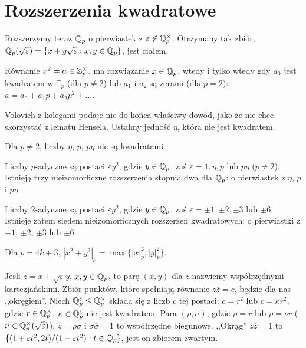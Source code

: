 \section{Rozszerzenia kwadratowe}
Rozszerzymy teraz $\mathbb Q_p$ o pierwiastek z $\varepsilon \not \in \mathbb Q_p^\times$. Otrzymany tak zbiór, $\mathbb Q_p(\sqrt{\varepsilon}) = \{x + y \sqrt{\varepsilon} : x, y \in \mathbb Q_p\}$, jest ciałem.

\begin{lemat}
	Równanie $x^2 = a \in \mathbb Z_p^\times$, ma rozwiązanie $x \in \mathbb Q_p$, wtedy i tylko wtedy gdy $a_0$ jest kwadratem w $\mathbb F_p$ (dla $p \neq 2$) lub $a_ 1$ i $a_2$ są zerami (dla $p = 2$): $a = a_0 + a_1p + a_2p^2 + \ldots$.
\end{lemat}

Volovich z kolegami podaje nie do końca właściwy dowód, jako że nie chce skorzystać z lematu Hensela.
Ustalmy  jedność $\eta$, która nie jest kwadratem.

\begin{wniosek}
	Dla $p \neq 2$, liczby $\eta$, $p$, $p \eta$ nie są kwadratami.
\end{wniosek}

\begin{wniosek}
	Liczby $p$-adyczne są postaci $\varepsilon y^2$, gdzie $y \in \mathbb Q_p$, zaś $\varepsilon = 1, \eta, p$ lub $p\eta$ ($p \neq 2$).
	Istnieją trzy nieizomorficzne rozszerzenia stopnia dwa dla $\mathbb Q_p$: o pierwiastek z $\eta$, $p$ i $p \eta$.
\end{wniosek}

\begin{wniosek}
	Liczby $2$-adyczne są postaci $\varepsilon y^2$, gdzie $y \in \mathbb Q_p$, zaś $\varepsilon = \pm 1, \pm 2, \pm 3$ lub $\pm 6$.
	Istnieje zatem siedem nieizomorficznych rozszerzeń kwadratowych: o pierwiastki z $-1$, $\pm 2$, $\pm 3$ lub $\pm 6$.
\end{wniosek}

\begin{wniosek}
	Dla $p = 4k + 3$, $|x^2 + y^2|_p = \max \{|x|^2_p, |y|_p^2\}$.
\end{wniosek}

Jeśli $z = x + \sqrt{\varepsilon} y$, $x, y \in \mathbb Q_p$, to parę $(x, y)$ dla $z$ nazwiemy współrzędnymi kartezjańskimi.
Zbiór punktów, które spełniają równanie $z \overline z = c$, będzie dla nas ,,okręgiem''.
Niech $\mathbb Q_p^\varepsilon \le \mathbb Q_p^\times$ składa się z liczb $c$ tej postaci: $c = r^2$ lub $c = \kappa r^2$, gdzie $r \in \mathbb Q_p^\times$, $\kappa \in \mathbb Q_p^\varepsilon$ nie jest kwadratem.
Para $(\rho, \sigma)$, gdzie $\rho = r$ lub $\rho = \nu r$ ($\nu \in \mathbb Q_p^\times (\sqrt \varepsilon)$), $z = \rho \sigma$ i $\sigma\overline \sigma = 1$ to współrzędne biegunowe.
,,Okrąg'' $z \overline z = 1$ to $\{(1 + \varepsilon t^2, 2t) / (1 - \varepsilon t^2) : t \in \mathbb Q_p\}$, jest on zbiorem zwartym.

